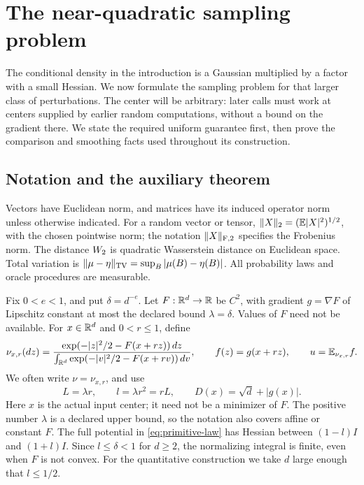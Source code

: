 \section{The near-quadratic sampling problem}\label{sec:preliminaries}

The conditional density in the introduction is a Gaussian multiplied
by a factor with a small Hessian. We now formulate the sampling
problem for that larger class of perturbations. The center will be
arbitrary: later calls must work at centers supplied by earlier
random computations, without a bound on the gradient there. We state
the required uniform guarantee first, then prove the comparison and
smoothing facts used throughout its construction.

\subsection{Notation and the auxiliary theorem}

Vectors have Euclidean norm, and matrices have its induced operator
norm unless otherwise indicated. For a random vector or tensor,
\(\lVert X\rVert_2=(\mathbb E|X|^2)^{1/2}\), with the chosen pointwise norm;
the notation \(\lVert X\rVert_{\mathrm F,2}\) specifies the Frobenius norm.
The distance \(W_2\) is quadratic Wasserstein distance on
Euclidean space. Total variation is
\(\lVert\mu-\eta\rVert_{\mathrm{TV}}=\sup_B|\mu(B)-\eta(B)|\).
All probability laws and oracle procedures are measurable.

Fix \(0<e<1\), and put \(\delta=d^{-e}\). Let
\(F:\mathbb R^d\to\mathbb R\) be \(C^2\), with gradient \(g=\nabla F\)
of Lipschitz constant at most the declared bound
\(\lambda=\delta\). Values of \(F\) need not be available.
For \(x\in\mathbb R^d\) and \(0<r\le1\), define
\begin{equation}\label{eq:primitive-law}
 \nu_{x,r}(dz)=
 \frac{\exp(-|z|^2/2-F(x+rz))\,dz}
 {\int_{\mathbb R^d}\exp(-|v|^2/2-F(x+rv))\,dv},
 \qquad f(z)=g(x+rz),\qquad u=\mathbb E_{\nu_{x,r}}f.
\end{equation}
We often write \(\nu=\nu_{x,r}\), and use
\begin{equation}\label{eq:primitive-scales}
 L=\lambda r,\qquad l=\lambda r^2=rL,\qquad
 D(x)=\sqrt d+|g(x)|.
\end{equation}
Here \(x\) is the actual input center; it need not be a minimizer
of \(F\). The positive number \(\lambda\) is a declared upper bound,
so the notation also covers affine or constant \(F\).
The full potential in \eqref{eq:primitive-law} has Hessian between
\((1-l)I\) and \((1+l)I\). Since \(l\le\delta<1\) for \(d\ge2\),
the normalizing integral is finite, even when \(F\) is not convex.
For the quantitative construction we take \(d\) large enough that
\(l\le1/2\).

